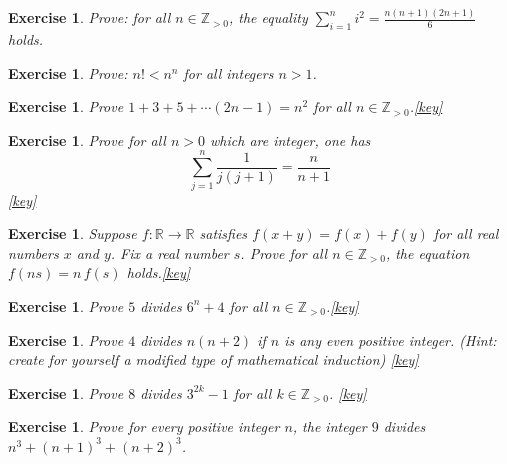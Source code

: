 \documentclass{book}
\newcounter{ekcounter}%
\theoremstyle{ekimcustom}
\newtheorem{exercise}[ekcounter]{Exercise}
\begin{document}
\begin{exercise}
Prove: for all $n \in \mathbb{Z}_{>0}$, the equality $\displaystyle \sum_{i=1}^n i^2 = \frac{n(n+1)(2n+1)}{6}$ holds.
\end{exercise}

\begin{exercise}
Prove: $n! < n^n$ for all integers $n > 1$.
\end{exercise}

\begin{exercise}
Prove $1+3+5+\cdots (2n-1) = n^2$ for all $n \in \mathbb{Z}_{>0}$.\quad\quad\href{https://www.sharelatex.com/project/5a0736a8a150fe764ab07afb}{{\color{red}[key]}}
\end{exercise}

\begin{exercise}
Prove for all $n > 0$ which are integer, one has 
\[ \sum_{j=1}^n \frac{1}{j(j+1)} = \frac{n}{n+1} \]
\quad\quad\href{https://www.sharelatex.com/project/5a073648a150fe764ab07aed}{{\color{red}[key]}}
\end{exercise}

\begin{exercise}
Suppose $f : \mathbb{R} \to \mathbb{R}$ satisfies $f(x+y)=f(x)+f(y)$ for all real numbers $x$ and $y$. Fix a real number $s$.  Prove for all $n \in \mathbb{Z}_{>0}$, the equation $f(ns)=n\,f(s)$ holds.\quad\quad\href{https://www.sharelatex.com/project/5a073787a150fe764ab07b4c}{{\color{red}[key]}}
\end{exercise}

\begin{exercise}
Prove $5$ divides $6^n+4$ for all $n \in \mathbb{Z}_{>0}$.\quad\quad\href{https://www.sharelatex.com/read/jqnhvtfzgqsp}{{\color{red}[key]}}
\end{exercise}

\begin{exercise}
Prove $4$ divides $n(n+2)$ if $n$ is any even positive integer. (Hint: create for yourself a modified type of mathematical induction) \quad\quad\href{https://www.sharelatex.com/read/hjkgbqfwdqjj}{{\color{red}[key]}}
\end{exercise}

\begin{exercise}
Prove $8$ divides $3^{2k}-1$ for all $k \in \mathbb{Z}_{>0}$. \quad\quad\href{https://www.sharelatex.com/read/ntwyhgyqzhdt}{{\color{red}[key]}}
\end{exercise}

\begin{exercise}
Prove for every positive integer $n$, the integer $9$ divides $n^3+(n+1)^3+(n+2)^3$.
\end{exercise}
\end{document}
